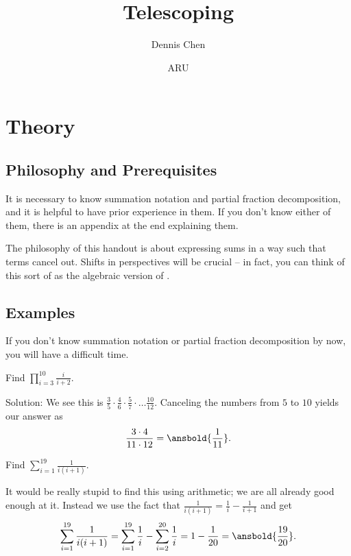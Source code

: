 \documentclass{article}
\title{Telescoping}
\author{Dennis Chen}
\date{ARU}
\begin{document}
\maketitle

\section{Theory}

\subsection{Philosophy and Prerequisites}

It is necessary to know summation notation and partial fraction decomposition, and it is helpful to have prior experience in them. If you don't know either of them, there is an appendix at the end explaining them.

The philosophy of this handout is about expressing sums in a way such that terms cancel out. Shifts in perspectives will be crucial -- in fact, you can think of this sort of as the algebraic version of .

\subsection{Examples}
If you don't know summation notation or partial fraction decomposition by now, you will have a difficult time.

\begin{exam}
Find $\prod\limits_{i=3}^{10}\frac{i}{i+2}.$
\end{exam}

\begin{sol}
Solution: We see this is $\frac{3}{5}\cdot \frac{4}{6}\cdot \frac{5}{7}\cdot \dots \frac{10}{12}.$ Canceling the numbers from $5$ to $10$ yields our answer as \[\frac{3\cdot 4}{11\cdot 12}=\ansbold{\frac{1}{11}}.\]
\end{sol}

\begin{exam}
Find $\sum\limits_{i=1}^{19} \frac{1}{i(i+1)}.$
\end{exam}

\begin{sol}
It would be really stupid to find this using arithmetic; we are all already good enough at it. Instead we use the fact that $\frac{1}{i(i+1)}=\frac{1}{i}-\frac{1}{i+1}$ and get \[\sum\limits_{i=1}^{19} \frac{1}{i(i+1)}=\sum\limits_{i=1}^{19} \frac{1}{i}-\sum\limits_{i=2}^{20}\frac{1}{i}=1-\frac{1}{20}=\ansbold{\frac{19}{20}}.\]
\end{sol}
\end{document}
